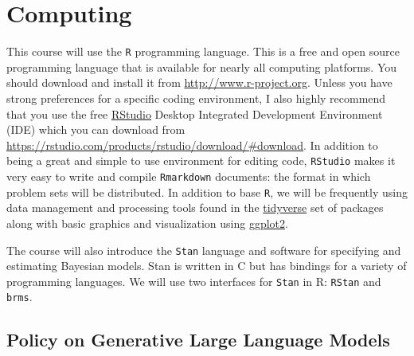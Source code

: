 \documentclass[11pt, article, oneside]{memoir}
\theoremstyle{Assumption}
\begin{document}
\section*{Computing}

This course will use the \texttt{R} programming language. This is a free and open source programming language that is available for nearly all computing platforms. You should download and install it from \url{http://www.r-project.org}. Unless you have strong preferences for a specific coding environment, I also highly recommend that you use the free \href{https://rstudio.com}{RStudio} Desktop Integrated Development Environment (IDE) which you can download from \url{https://rstudio.com/products/rstudio/download/#download}. In addition to being a great and simple to use environment for editing code, \texttt{RStudio} makes it very easy to write and compile \texttt{Rmarkdown} documents: the format in which problem sets will be distributed. In addition to base \texttt{R}, we will be frequently using data management and processing tools found in the \href{https://www.tidyverse.org/}{tidyverse} set of packages along with basic graphics and visualization using \href{https://ggplot2.tidyverse.org/}{ggplot2}. 

The course will also introduce the \texttt{Stan} language and software for specifying and estimating Bayesian models. Stan is written in C but has bindings for a variety of programming languages. We will use two interfaces for \texttt{Stan} in R: \texttt{RStan} and \texttt{brms}. 

\subsection*{Policy on Generative Large Language Models}
\end{document}
